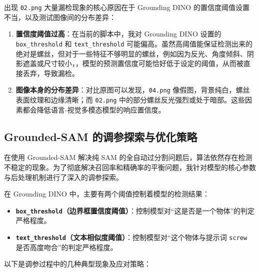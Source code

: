 \documentclass[12pt,a4paper]{ctexart}
\begin{document}
出现 \texttt{02.png} 大量漏检现象的核心原因在于 Grounding DINO 的置信度阈值设置不当，以及测试图像间的分布差异：
\begin{enumerate}
    \item \textbf{置信度阈值过高}：在当前的脚本中，我对 Grounding DINO 设置的 \texttt{box\_threshold} 和 \texttt{text\_threshold} 可能偏高。虽然高阈值能保证检测出来的绝对是螺丝，但对于一些特征不够明显的螺丝，例如因为反光、角度倾斜、阴影遮盖或尺寸较小，，模型的预测置信度可能恰好低于设定的阈值，从而被直接丢弃，导致漏检。
    \item \textbf{图像本身的分布差异}：对比原图可以发现，\texttt{04.png} 像假图，背景纯白，螺丝表面纹理和边缘清晰；而 \texttt{02.png} 中的部分螺丝反光强烈或处于暗部。这些因素都会降低语言-视觉多模态模型的响应置信度。
\end{enumerate}

\subsection{Grounded-SAM 的调参探索与优化策略}
在使用 Grounded-SAM 解决纯 SAM 的全自动过分割问题后，算法依然存在检测不稳定的现象。为了彻底解决召回率和精确率的平衡问题，我针对模型的核心参数与后处理机制进行了深入的调参探索。

在 Grounding DINO 中，主要有两个阈值控制着模型的检测结果：
\begin{itemize}
    \item \textbf{\texttt{box\_threshold}（边界框置信度阈值）}：控制模型对“这是否是一个物体”的判定严格程度。
    \item \textbf{\texttt{text\_threshold}（文本相似度阈值）}：控制模型对“这个物体与提示词 \texttt{screw} 是否高度吻合”的判定严格程度。
\end{itemize}

以下是调参过程中的几种典型现象及应对策略：
\end{document}
